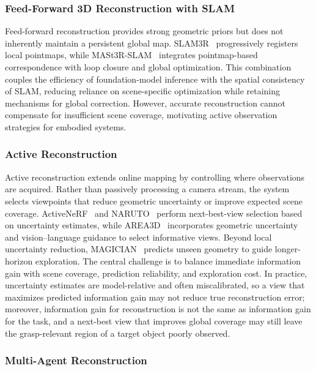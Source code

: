 \documentclass{SCIS2026}
\begin{document}
\subsubsection{Feed-Forward 3D Reconstruction with SLAM}

Feed-forward reconstruction provides strong geometric priors but does not inherently maintain a persistent global map. SLAM3R~\cite{liu2025slam3r} progressively registers local pointmaps, while MASt3R-SLAM~\cite{murai2025mast3r} integrates pointmap-based correspondence with loop closure and global optimization. This combination couples the efficiency of foundation-model inference with the spatial consistency of SLAM, reducing reliance on scene-specific optimization while retaining mechanisms for global correction. However, accurate reconstruction cannot compensate for insufficient scene coverage, motivating active observation strategies for embodied systems.

\subsubsection{Active Reconstruction}

Active reconstruction extends online mapping by controlling where observations are acquired. Rather than passively processing a camera stream, the system selects viewpoints that reduce geometric uncertainty or improve expected scene coverage. ActiveNeRF~\cite{pan2022activenerf} and NARUTO~\cite{feng2024naruto} perform next-best-view selection based on uncertainty estimates, while AREA3D~\cite{xu2026area3d} incorporates geometric uncertainty and vision--language guidance to select informative views. Beyond local uncertainty reduction, MAGICIAN~\cite{li2026magician} predicts unseen geometry to guide longer-horizon exploration. The central challenge is to balance immediate information gain with scene coverage, prediction reliability, and exploration cost. In practice, uncertainty estimates are model-relative and often miscalibrated, so a view that maximizes predicted information gain may not reduce true reconstruction error; moreover, information gain for reconstruction is not the same as information gain for the task, and a next-best view that improves global coverage may still leave the grasp-relevant region of a target object poorly observed.

\subsubsection{Multi-Agent Reconstruction}
\end{document}
